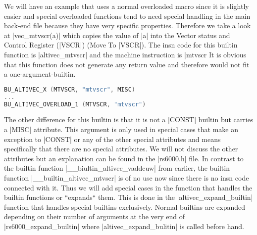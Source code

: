 We will have an example that uses a normal overloaded macro since it is slightly easier and special overloaded functions tend to need special handling in the main back-end file because they have very specific properties. Therefore we take a look at |vec_mtvscr(a)| which copies the value of |a| into the Vector status and Control Register (|VSCR|) (Move To |VSCR|). The insn code for this builtin function is |altivec_mtvscr| and the machine instruction is |mtvscr %
It is obvious that this function does not generate any return value and therefore would not fit a one-argument-builtin.
\begin{lstlisting}[language=C++,basicstyle=\ttfamily\scriptsize,keywordstyle=\color{red}] 
BU_ALTIVEC_X (MTVSCR, "mtvscr",	MISC)
...
BU_ALTIVEC_OVERLOAD_1 (MTVSCR, "mtvscr")
\end{lstlisting}
The other difference for this builtin is that it is not a |CONST| builtin but carries a |MISC| attribute. This argument is only used in special cases that make an exception to |CONST| or any of the other special attributes and means specifically that there are no special attributes. We will not discuss the other attributes but an explanation can be found in the |rs6000.h| file.
In contrast to the builtin function |__biultin_altivec_vaddcuw| from earlier, the builtin function |__builtin_altivec_mtvscr| is of no use now since there is no insn code connected with it. Thus we will add special cases in the function that handles the builtin functions or ``expands`` them. This is done in the |altivec_expand_builtin| function that handles special builtins exclusively. Normal builtins are expanded depending on their number of arguments at the very end of |rs6000_expand_builtin| where |altivec_expand_bulitin| is called before hand. 

